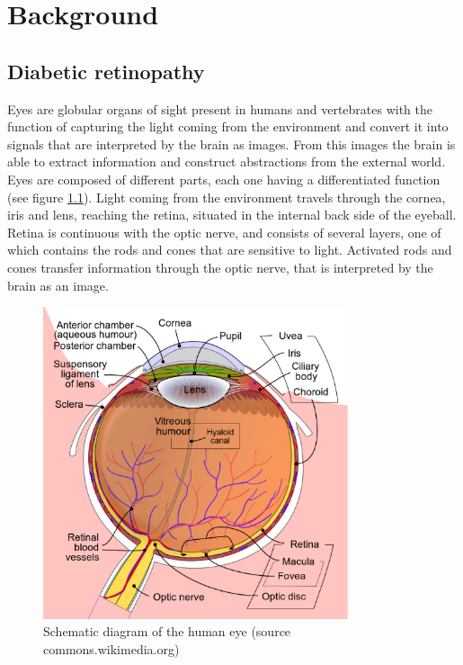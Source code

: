 
\chapter{Background} %

\label{Chapter:Background} %


\section{Diabetic retinopathy}

Eyes are globular organs of sight present in humans and vertebrates with the function of capturing the light coming from the environment and convert it into signals that are interpreted by the brain as images. From this images the brain is able to extract information and construct abstractions from the external world. Eyes are composed of different parts, each one having a differentiated function (see figure \ref{back:fig:eye}). Light coming from the environment travels through the cornea, iris and lens, reaching the retina, situated in the internal back side of the eyeball. Retina is continuous with the optic nerve, and consists of several layers, one of which contains the rods and cones that are sensitive to light. Activated rods and cones transfer information through the optic nerve, that is interpreted by the brain as an image.


\begin{figure}[!htb]
	\centering
	\includegraphics[width=0.8\textwidth]{Figures/chapter_introduction/eye_en.eps}
	\caption[Schematic diagram of the human eye]{Schematic diagram of the human eye (source commons.wikimedia.org)}
	\label{back:fig:eye}
\end{figure}

